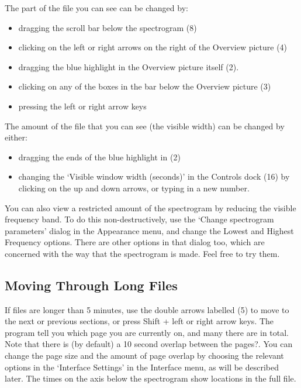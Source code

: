 \documentclass{article}
\begin{document}
The part of the file you can see can be changed by:
	\begin{itemize}
	\item dragging the scroll bar below the spectrogram (8)
	\item clicking on the left or right arrows on the right of the Overview picture (4)
	\item dragging the blue highlight in the Overview picture itself (2). 
	\item clicking on any of the boxes in the bar below the Overview picture (3)
	\item pressing the left or right arrow keys
	\end{itemize}
The amount of the file that you can see (the visible width) can be changed by either: 
	\begin{itemize}
	\item dragging the ends of the blue highlight in (2)
	\item changing the `Visible window width (seconds)' in the Controls dock (16) by clicking on the up and down arrows, or typing in a new number.
	\end{itemize}

You can also view a restricted amount of the spectrogram by reducing the visible frequency band. To do this non-destructively, use the `Change spectrogram parameters' dialog in the Appearance menu, and change the Lowest and Highest Frequency options. There are other options in that dialog too, which are concerned with the way that the spectrogram is made. Feel free to try them. %
\subsection{Moving Through Long Files}

If files are longer than 5 minutes, use the double arrows labelled (5) to move to the next or previous sections, or press Shift + left or right arrow keys. The program tell you which page you are currently on, and many there are in total. Note that there is (by default) a 10 second overlap between the pages?. You can change the page size and the amount of page overlap by choosing the relevant options in the `Interface Settings' in the Interface menu, as will be described later. The times on the axis below the spectrogram show locations in the full file.
\end{document}
